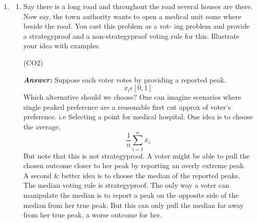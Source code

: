 \documentclass[15pt]{article}
\begin{document}
\begin{enumerate}
\begin{enumerate}
But in subsequent years the site will slowly approach towards extinction.\\
\item Write an algorithm for the ranked choice voting in a pseudocode
form. With an example explain its salient features.
\begin{flushright}
[3] (CO2)
\end{flushright}
\textbf{\emph{Answer: }}\\ \textbf{Ranked-Choice voting:-}
\begin{enumerate}
\item Voters submit a full ranked list
\item If there is some alternatives a* that received more than 50\% of the first choice votes,
then, a* is the winner
\item Else, the alternative with the fewest first-choice votes is deleted \& the winner is computed recursively on the remaining alternatives.
\end{enumerate}
Ranked choice voting is not strategyproof. The intuition is that there can be an incentive to influence who gets eliminated early on, so that our preffered guy gets more favoured matchups in later rounds. Compared to the plurality rule, however it seems trickier for a voter to reason about how to game the system in ranked choice voiting. This is one of the reason why most voting to plurality voting.
For example, even if we know everyone else's votes, the problem of checking for a profitable manipulation is NP Hard.\\
\end{enumerate}
\item
\begin{enumerate}
\item Say there is a long road and throughout the road several houses
are there. Now say, the town authority wants to open a medical
unit some where beside the road. You cast this problem as a vot-
ing problem and provide a strategyproof and a non-strategyproof
voting rule for this. Illustrate your idea with examples.
\begin{flushright}
[1+3+2] (CO2)
\end{flushright}
\textbf{\emph{Answer: }} Suppose each voter votes by providing a reported peak. \[x_i\epsilon [0,1]\] Which alternative should we choose?
One can imagine scenarios where single peaked preference are a reasonable first cut approx of voter's preference. i.e Selecting a point for medical hospital.
One idea is to choose the average, \[\frac{1}{n} \sum_{i=1}^{n} x_i\] But note that this is not strategyproof. A voter might be able to pull the chosen outcome closer to her peak by reporting an overly extreme peak. A second \& better idea is to choose the median of the reported peaks. The median voting rule is strategyproof. The only way a voter can manipulate the median is to report a peak on the opposite side of the median from her true peak. But this can only pull the median far away from her true peak, a worse outcome for her.

\end{enumerate}
\end{enumerate}
\end{document}
